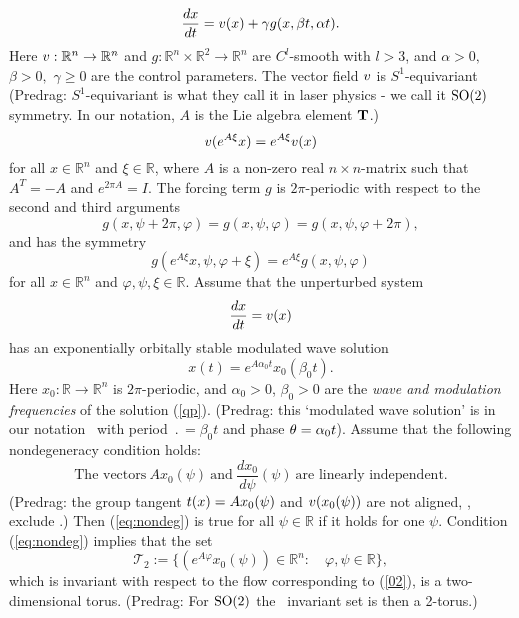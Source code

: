 \begin{description}
\begin{equation}
\frac{dx}{dt}=v(x)+\gamma g(x,\beta t,\alpha t).
\label{01}
\end{equation}
Here $v:\mathbb{R}^{n}\to\mathbb{R}^{n}$ and
$g:\mathbb{R}^{n}\times\mathbb{R}^{2}\to\mathbb{R}^{n}$ are
$C^{l}$-smooth with $l>3$, and $\alpha>0,$ $\beta>0,$ $\gamma\ge0$ are
the control parameters. The vector field $v$ is $S^{1}$-equivariant
(Predrag:
$S^{1}$-equivariant is what they call it in laser physics - we call it
$\textrm{SO}(2)$ symmetry. In our notation, $A$ is the Lie algebra element $\mathbf{T}$.)
\begin{equation}
v(e^{A\xi}x)=e^{A\xi}v(x)
\label{eq:symf}
\end{equation}
for all $x\in\mathbb{R}^{n}$ and $\xi\in\mathbb{R}$, where $A$
is a non-zero real $n\times n$-matrix such that $A^{T}=-A$ and $e^{2\pi A}=I$.
The forcing term $g$ is $2\pi$-periodic with respect
to the second and third arguments
\[
g(x,\psi+2\pi,\varphi)=g(x,\psi,\varphi)=g(x,\psi,\varphi+2\pi),
\]
 and has the symmetry
\begin{equation}
g(e^{A\xi}x,\psi,\varphi+\xi)=e^{A\xi}g(x,\psi,\varphi)
\label{eq:symg}
\end{equation}
 for all $x\in\mathbb{R}^{n}$ and $\varphi,\psi,\xi\in\mathbb{R}.$
Assume that the unperturbed system
\begin{equation}
\frac{dx}{dt}=v(x)\label{02}
\end{equation}
 has an exponentially orbitally stable modulated wave solution
\begin{equation}
x(t)=e^{A\alpha_{0}t}x_{0}(\beta_{0}t).
\label{qp}
\end{equation}
                                                                \toCB
Here $x_{0}:\mathbb{R}\to\mathbb{R}^{n}$ is $2\pi$-periodic, and
$\alpha_{0}>0$, $\beta_{0}>0$ are the \emph{wave and modulation
frequencies} of the solution (\ref{qp}). (Predrag: this `modulated wave
solution' is in our notation \rpo\ with period $\period{}=\beta_{0}t$ and
phase ${\bf \theta} =\alpha_{0}t$).
Assume that the following nondegeneracy
condition holds:
\begin{equation}
\mbox{The vectors}\ Ax_{0}(\psi)\ \mbox{and}\
     \frac{dx_{0}}{d\psi}(\psi)\ \mbox{are linearly independent.}
\label{eq:nondeg}
\end{equation}
(Predrag:
the group tangent $t(x) =  Ax_{0}(\psi)$ and $v(x_{0}(\psi))$
are not aligned, \ie, exclude \reqva.)
Then (\ref{eq:nondeg}) is true for all $\psi\in\mathbb{R}$
if it holds for one $\psi$. Condition (\ref{eq:nondeg}) implies
that the set
\begin{equation}
\mathcal{T}_{2}:=\{(e^{A\varphi}x_{0}(\psi))\in\mathbb{R}^{n}:\quad\varphi,\psi\in\mathbb{R}\},
\label{eq:torus}
\end{equation}
which is invariant with respect to the flow corresponding to (\ref{02}),
is a two-dimensional torus.
(Predrag:
For $\textrm{SO}(2)$ the \rpo\ invariant set is then a
2-torus.)


\end{description}
